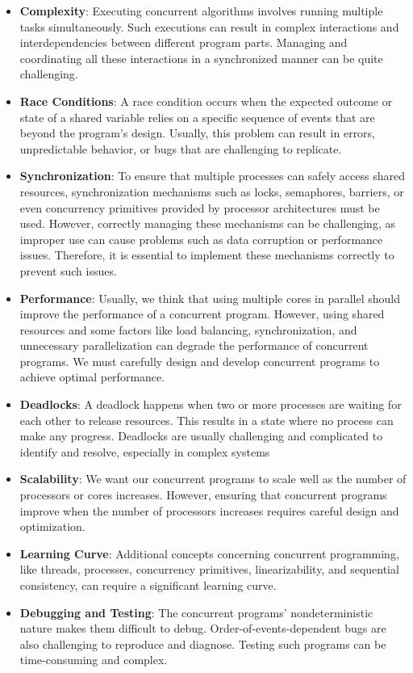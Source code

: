 \begin{itemize}
  \item \textbf{Complexity}: Executing concurrent algorithms involves running multiple tasks simultaneously. Such executions can result in complex interactions and interdependencies between different program parts. Managing and coordinating all these interactions in a synchronized manner can be quite challenging.
  \item \textbf{Race Conditions}: A race condition occurs when the expected outcome or state of a shared variable relies on a specific sequence of events that are beyond the program's design. Usually, this problem can result in errors, unpredictable behavior, or bugs that are challenging to replicate.
  \item \textbf{Synchronization}: To ensure that multiple processes can safely access shared resources, synchronization mechanisms such as locks, semaphores, barriers, or even concurrency primitives provided by processor architectures must be used. However, correctly managing these mechanisms can be challenging, as improper use can cause problems such as data corruption or performance issues. Therefore, it is essential to implement these mechanisms correctly to prevent such issues.
  \item \textbf{Performance}: Usually, we think that using multiple cores in parallel should improve the performance of a concurrent program. However, using shared resources and some factors like load balancing, synchronization, and unnecessary parallelization can degrade the performance of concurrent programs. We must carefully design and develop concurrent programs to achieve optimal performance.
  \item \textbf{Deadlocks}: A deadlock happens when two or more processes are waiting for each other to release resources. This results in a state where no process can make any progress. Deadlocks are usually challenging and complicated to identify and resolve, especially in complex systems
  \item \textbf{Scalability}: We want our concurrent programs to scale well as the number of processors or cores increases. However, ensuring that concurrent programs improve when the number of processors increases requires careful design and optimization.
  \item \textbf{Learning Curve}: Additional concepts concerning concurrent programming, like threads, processes, concurrency primitives, linearizability, and sequential consistency, can require a significant learning curve.
  \item \textbf{Debugging and Testing}: The concurrent programs' nondeterministic nature makes them difficult to debug. Order-of-events-dependent bugs are also challenging to reproduce and diagnose. Testing such programs can be time-consuming and complex.

\end{itemize}

